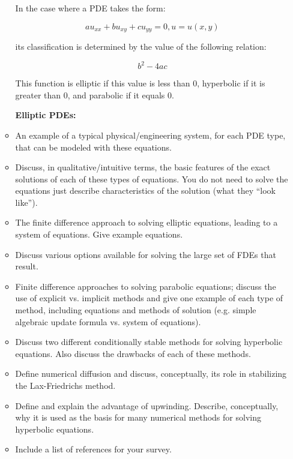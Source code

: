\documentclass{article}
\begin{document}
\begin{enumerate}
\begin{itemize}
      In the case where a PDE takes the form:
      
      \begin{equation}
      au_{xx} + bu_{xy} + cu_{yy} = 0, u = u(x,y)
      \end{equation}
      
      its classification is determined by the value of the following relation:
      
      \begin{equation}
      b^2 - 4ac
      \end{equation}
      
      This function is elliptic if this value is less than 0, hyperbolic if it is greater than 0, and parabolic if it equals 0.
      
      \textbf{Elliptic PDEs:}
      
      
      
      \item An example of a typical physical/engineering system, for each PDE type, that can be modeled with these equations.
      \item Discuss, in qualitative/intuitive terms, the basic features of the exact solutions of each of these types of equations.  You do not need to solve the equations just describe characteristics of the solution (what they ``look like'').
      \item The finite difference approach to solving elliptic equations, leading to a system of equations.  Give example equations.  
      \item Discuss various options available for solving the large set of FDEs that result.  
      \item Finite difference approaches to solving parabolic equations; discuss the use of explicit vs. implicit methods and give one example of each type of method, including equations and methods of solution (e.g. simple algebraic update formula vs. system of equations).
      \item Discuss two different conditionally stable methods for solving hyperbolic equations.  Also discuss the drawbacks of each of these methods.  
      \item Define numerical diffusion and discuss, conceptually, its role in stabilizing the Lax-Friedrichs method.  
      \item Define and explain the advantage of upwinding.  Describe, conceptually, why it is used as the basis for many numerical methods for solving hyperbolic equations.  
      \item Include a list of references for your survey.
    \end{itemize}
    

\end{enumerate}
\end{document}

